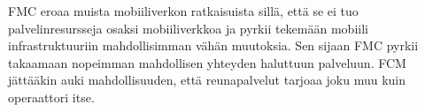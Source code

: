FMC eroaa muista mobiiliverkon ratkaisuista sillä, että se ei tuo palvelinresursseja osaksi mobiiliverkkoa ja pyrkii tekemään mobiili infrastruktuuriin mahdollisimman vähän muutoksia. Sen sijaan FMC pyrkii takaamaan nopeimman mahdollisen yhteyden haluttuun palveluun. FCM jättääkin auki mahdollisuuden, että reunapalvelut tarjoaa joku muu kuin operaattori itse.
